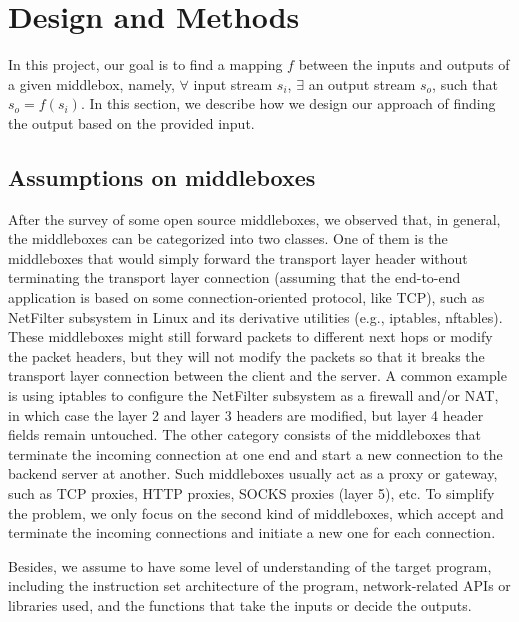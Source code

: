 \section{Design and Methods}

In this project, our goal is to find a mapping $f$ between the inputs and
outputs of a given middlebox, namely, $\forall$ input stream $s_i$, $\exists$
an output stream $s_o$, such that $s_o = f(s_i)$. In this section, we describe
how we design our approach of finding the output based on the provided input.


\subsection{Assumptions on middleboxes}

After the survey of some open source middleboxes, we observed that, in general,
the middleboxes can be categorized into two classes. One of them is the
middleboxes that would simply forward the transport layer header without
terminating the transport layer connection (assuming that the end-to-end
application is based on some connection-oriented protocol, like TCP), such as
NetFilter subsystem in Linux and its derivative utilities (e.g., iptables,
nftables). These middleboxes might still forward packets to different next hops
or modify the packet headers, but they will not modify the packets so that it
breaks the transport layer connection between the client and the server. A
common example is using iptables to configure the NetFilter subsystem as a
firewall and/or NAT, in which case the layer 2 and layer 3 headers are modified,
but layer 4 header fields remain untouched. The other category consists of the
middleboxes that terminate the incoming connection at one end and start a new
connection to the backend server at another. Such middleboxes usually act as a
proxy or gateway, such as TCP proxies, HTTP proxies, SOCKS proxies (layer 5),
etc. To simplify the problem, we only focus on the second kind of middleboxes,
which accept and terminate the incoming connections and initiate a new one for
each connection.

Besides, we assume to have some level of understanding of the target program,
including the instruction set architecture of the program, network-related APIs
or libraries used, and the functions that take the inputs or decide the outputs.


